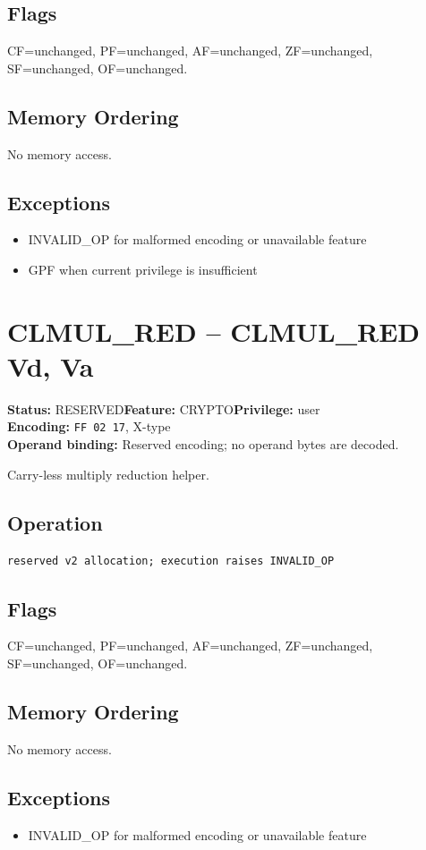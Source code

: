 \documentclass[10pt]{article}
\begin{document}
\subsection*{Flags}
CF=unchanged, PF=unchanged, AF=unchanged, ZF=unchanged, SF=unchanged, OF=unchanged.
\subsection*{Memory Ordering}
No memory access.
\subsection*{Exceptions}
\begin{itemize}
\item INVALID\_OP for malformed encoding or unavailable feature
\item GPF when current privilege is insufficient
\end{itemize}
\clearpage

\section{CLMUL\_RED -- CLMUL\_RED Vd, Va}
\textbf{Status:} RESERVED\quad \textbf{Feature:} CRYPTO\quad \textbf{Privilege:} user\\
\textbf{Encoding:} \texttt{FF 02 17}, X-type\\
\textbf{Operand binding:} Reserved encoding; no operand bytes are decoded.

Carry-less multiply reduction helper.

\subsection*{Operation}
\begin{lstlisting}
reserved v2 allocation; execution raises INVALID_OP
\end{lstlisting}
\subsection*{Flags}
CF=unchanged, PF=unchanged, AF=unchanged, ZF=unchanged, SF=unchanged, OF=unchanged.
\subsection*{Memory Ordering}
No memory access.
\subsection*{Exceptions}
\begin{itemize}
\item INVALID\_OP for malformed encoding or unavailable feature
\end{itemize}
\clearpage
\end{document}
